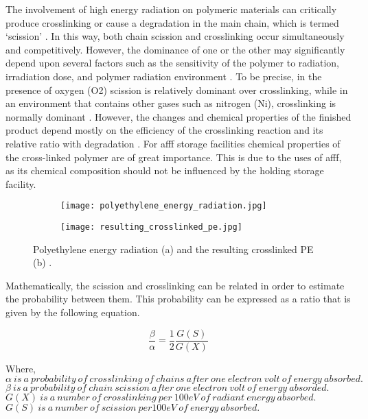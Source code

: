The involvement of high energy radiation on polymeric materials can critically produce crosslinking or cause a degradation in the main chain, which is termed ‘scission’ \cite{meola2005cross}. In this way, both chain scission and crosslinking occur simultaneously and competitively. However, the dominance of one or the other may significantly depend upon several factors such as the sensitivity of the polymer to radiation, irradiation dose, and polymer radiation environment \cite{meola2005cross}. To be precise, in the presence of oxygen (O2) scission is relatively dominant over crosslinking, while in an environment that contains other gases such as nitrogen (Ni), crosslinking is normally dominant \cite{peacock2000handbook}. However, the changes and chemical properties of the finished product depend mostly on the efficiency of the crosslinking reaction and its relative ratio with degradation \cite{meola2005cross}. For \acrshort{afff} storage facilities chemical properties of the cross-linked polymer are of great importance. This is due to the uses of \acrshort{afff}, as its chemical composition should not be influenced by the holding storage facility.

\begin{figure}[H]
\captionsetup[subfigure]{justification=raggedright}

\centering

\begin{subfigure}{.9\textwidth}
    \centering
    \texttt{[image: polyethylene\_energy\_radiation.jpg]}
    \caption{}
\end{subfigure}
\begin{subfigure}{.9\textwidth}
    \centering
    \texttt{[image: resulting\_crosslinked\_pe.jpg]}
    \caption{}
\end{subfigure}

\caption{Polyethylene energy radiation (a) and the resulting crosslinked PE (b) \cite{peacock2000handbook}.}
\label{ch3:figure:radiation}
\end{figure}

Mathematically, the scission and crosslinking can be related in order to estimate the probability between them. This probability can be expressed as a ratio that is given by the following equation.

\begin{equation}
    \frac{\beta}{\alpha}=\frac{1}{2}\frac{G(S)}{G(X)}
\end{equation}

\begin{doublespace}
\noindent Where, \\
$\alpha\ is\ a\ probability\ of\ crosslinking\ of\ chains\ after\ one\ electron\ volt\ of\ energy\ absorbed.$ \\
$\beta\ is\ a\ probability\ of\ chain\ scission\ after\ one\ electron\ volt\ of\ energy\ absorded.$ \\
$G(X)\ is\ a\ number\ of\ crosslinking\ per\ 100eV\ of\ radiant\ energy\ absorbed.$ \\
$G(S)\ is\ a\ number\ of\ scission\ per 100eV\ of\ energy\ absorbed.$ \\
\end{doublespace}

